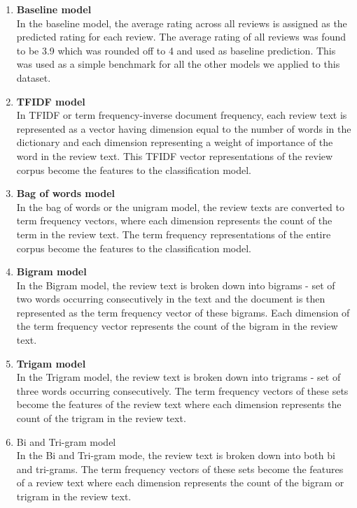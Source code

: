 \documentclass[paper=a4, fontsize=11pt]{scrartcl} %
\numberwithin{equation}{section} %
\numberwithin{figure}{section} %
\numberwithin{table}{section} %
\begin{document}
\begin{enumerate}

\item \textbf{Baseline model}\\
In the baseline model, the average rating across all reviews is assigned as the predicted rating for each review. The average rating of all reviews was found to be 3.9 which was rounded off to 4 and used as baseline prediction. This was used as a simple benchmark for all the other models we applied to this dataset.

\item \textbf{TFIDF model}\\
In TFIDF or term frequency-inverse document frequency, each review text is represented as a vector having dimension equal to the number of words in the dictionary and each dimension representing a weight of importance of the word in the review text. This TFIDF vector representations of the review corpus become the features to the classification model.

\item \textbf{Bag of words model}\\
In the bag of words or the unigram model, the review texts are converted to term frequency vectors, where each dimension represents the count of the term in the review text. The term frequency representations of the entire corpus become the features to the classification model.

\item \textbf{Bigram model}\\
In the Bigram model, the review text is broken down into bigrams - set of two words occurring consecutively in the text and the document is then represented as the term frequency vector of these bigrams. Each dimension of the term frequency vector represents the count of the bigram in the review text. 

\item \textbf{Trigam model}\\
In the Trigram model, the review text is broken down into trigrams - set of three words occurring consecutively. The term frequency vectors of these sets become the features of the review text where each dimension represents the count of the trigram in the review text.

\item Bi and Tri-gram model\\
In the Bi and Tri-gram mode, the review text is broken down into both bi and tri-grams. The term frequency vectors of these sets become the features of a review text where each dimension represents the count of the bigram or trigram in the review text.


\end{enumerate}
\end{document}
